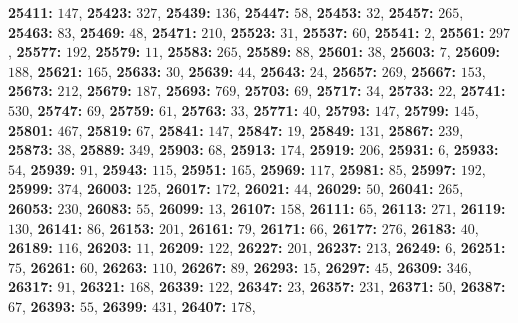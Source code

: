 \textsf{\bfseries 25411:} $147$, \textsf{\bfseries 25423:} $327$, \textsf{\bfseries 25439:} $136$, \textsf{\bfseries 25447:} $58$, \textsf{\bfseries 25453:} $32$, \textsf{\bfseries 25457:} $265$, \textsf{\bfseries 25463:} $83$, \textsf{\bfseries 25469:} $48$, \textsf{\bfseries 25471:} $210$, \textsf{\bfseries 25523:} $31$, \textsf{\bfseries 25537:} $60$, \textsf{\bfseries 25541:} $2$, \textsf{\bfseries 25561:} $297$, \textsf{\bfseries 25577:} $192$, \textsf{\bfseries 25579:} $11$, \textsf{\bfseries 25583:} $265$, \textsf{\bfseries 25589:} $88$, \textsf{\bfseries 25601:} $38$, \textsf{\bfseries 25603:} $7$, \textsf{\bfseries 25609:} $188$, \textsf{\bfseries 25621:} $165$, \textsf{\bfseries 25633:} $30$, \textsf{\bfseries 25639:} $44$, \textsf{\bfseries 25643:} $24$, \textsf{\bfseries 25657:} $269$, \textsf{\bfseries 25667:} $153$, \textsf{\bfseries 25673:} $212$, \textsf{\bfseries 25679:} $187$, \textsf{\bfseries 25693:} $769$, \textsf{\bfseries 25703:} $69$, \textsf{\bfseries 25717:} $34$, \textsf{\bfseries 25733:} $22$, \textsf{\bfseries 25741:} $530$, \textsf{\bfseries 25747:} $69$, \textsf{\bfseries 25759:} $61$, \textsf{\bfseries 25763:} $33$, \textsf{\bfseries 25771:} $40$, \textsf{\bfseries 25793:} $147$, \textsf{\bfseries 25799:} $145$, \textsf{\bfseries 25801:} $467$, \textsf{\bfseries 25819:} $67$, \textsf{\bfseries 25841:} $147$, \textsf{\bfseries 25847:} $19$, \textsf{\bfseries 25849:} $131$, \textsf{\bfseries 25867:} $239$, \textsf{\bfseries 25873:} $38$, \textsf{\bfseries 25889:} $349$, \textsf{\bfseries 25903:} $68$, \textsf{\bfseries 25913:} $174$, \textsf{\bfseries 25919:} $206$, \textsf{\bfseries 25931:} $6$, \textsf{\bfseries 25933:} $54$, \textsf{\bfseries 25939:} $91$, \textsf{\bfseries 25943:} $115$, \textsf{\bfseries 25951:} $165$, \textsf{\bfseries 25969:} $117$, \textsf{\bfseries 25981:} $85$, \textsf{\bfseries 25997:} $192$, \textsf{\bfseries 25999:} $374$, \textsf{\bfseries 26003:} $125$, \textsf{\bfseries 26017:} $172$, \textsf{\bfseries 26021:} $44$, \textsf{\bfseries 26029:} $50$, \textsf{\bfseries 26041:} $265$, \textsf{\bfseries 26053:} $230$, \textsf{\bfseries 26083:} $55$, \textsf{\bfseries 26099:} $13$, \textsf{\bfseries 26107:} $158$, \textsf{\bfseries 26111:} $65$, \textsf{\bfseries 26113:} $271$, \textsf{\bfseries 26119:} $130$, \textsf{\bfseries 26141:} $86$, \textsf{\bfseries 26153:} $201$, \textsf{\bfseries 26161:} $79$, \textsf{\bfseries 26171:} $66$, \textsf{\bfseries 26177:} $276$, \textsf{\bfseries 26183:} $40$, \textsf{\bfseries 26189:} $116$, \textsf{\bfseries 26203:} $11$, \textsf{\bfseries 26209:} $122$, \textsf{\bfseries 26227:} $201$, \textsf{\bfseries 26237:} $213$, \textsf{\bfseries 26249:} $6$, \textsf{\bfseries 26251:} $75$, \textsf{\bfseries 26261:} $60$, \textsf{\bfseries 26263:} $110$, \textsf{\bfseries 26267:} $89$, \textsf{\bfseries 26293:} $15$, \textsf{\bfseries 26297:} $45$, \textsf{\bfseries 26309:} $346$, \textsf{\bfseries 26317:} $91$, \textsf{\bfseries 26321:} $168$, \textsf{\bfseries 26339:} $122$, \textsf{\bfseries 26347:} $23$, \textsf{\bfseries 26357:} $231$, \textsf{\bfseries 26371:} $50$, \textsf{\bfseries 26387:} $67$, \textsf{\bfseries 26393:} $55$, \textsf{\bfseries 26399:} $431$, \textsf{\bfseries 26407:} $178$, 
